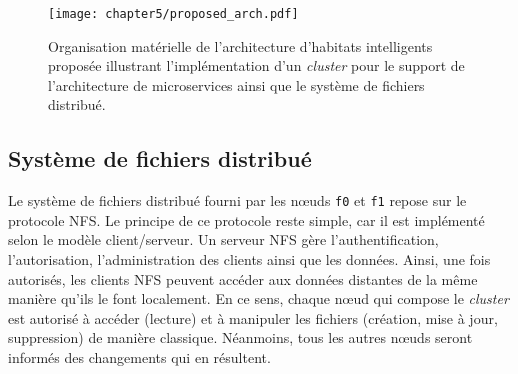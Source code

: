 \begin{figure}[H]
	\centering
	\texttt{[image: chapter5/proposed\_arch.pdf]}
        \caption{Organisation matérielle de l'architecture d'habitats intelligents proposée illustrant l'implémentation d'un \textit{cluster} pour le support de l'architecture de microservices ainsi que le système de fichiers distribué.}
	\label{fig:proposed_arch}
\end{figure}

\subsection{Système de fichiers distribué}

Le système de fichiers distribué fourni par les n\oe{}uds \texttt{f0} et \texttt{f1} repose sur le protocole \ac{NFS}. Le principe de ce protocole reste simple, car il est implémenté selon le modèle client/serveur. Un serveur \acs{NFS} gère l'authentification, l'autorisation, l'administration des clients ainsi que les données. Ainsi, une fois autorisés, les clients NFS peuvent accéder aux données distantes de la même manière qu'ils le font localement. En ce sens, chaque n\oe{}ud qui compose le \textit{cluster} est autorisé à accéder (lecture) et à manipuler les fichiers (création, mise à jour, suppression) de manière classique. Néanmoins, tous les autres n\oe{}uds seront informés des changements qui en résultent.

